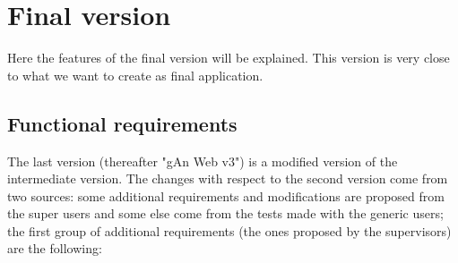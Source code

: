 
\chapter{Final version} %

\label{Chapter6} %

Here the features of the final version will be explained. This version is very close to what we want to create as final application.

\section{Functional requirements}

The last version (thereafter "gAn Web v3") is a modified version of the intermediate version. 
The changes with respect to the second version come from two sources: some additional requirements and modifications are proposed from the super users and some else come from the tests made with the generic users; 
the first group of additional requirements (the ones proposed by the supervisors) are the following:


